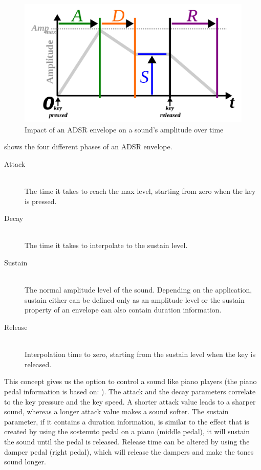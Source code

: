 \begin{figure}[htb]
  \centerline{\includegraphics[width=0.8\linewidth]{images/ADSR_parameter.png}}
  \caption[Impact of an ADSR envelope on a sound's amplitude over time -
  \protect{}
  \protect{}]{Impact of an ADSR envelope on a sound's amplitude over time}
  \label{fig:ADSR}
\end{figure}

 shows the four different phases of an ADSR envelope.

\begin{description}
  \item[Attack] \hfill \\
  The time it takes to reach the max level, starting from zero when the key is pressed.
  \item[Decay] \hfill \\
  The time it takes to interpolate to the sustain level.
  \item[Sustain] \hfill \\
  The normal amplitude level of the sound. Depending on the application, sustain either can be defined only as an amplitude level or the sustain property of an envelope can also contain duration information.
  \item[Release] \hfill \\
  Interpolation time to zero, starting from the sustain level when the key is released.
\end{description}

This concept gives us the option to control a sound like piano players (the piano pedal information is based on: \cite[p. 72]{pilhofer2011music}). The attack and the decay parameters correlate to the key pressure and the key speed. A shorter attack value leads to a sharper sound, whereas a longer attack value makes a sound softer. The sustain parameter, if it contains a duration information, is similar to the effect that is created by using the sostenuto pedal on a piano (middle pedal), it will sustain the sound until the pedal is released. Release time can be altered by using the damper pedal (right pedal), which will release the dampers and make the tones sound longer.

